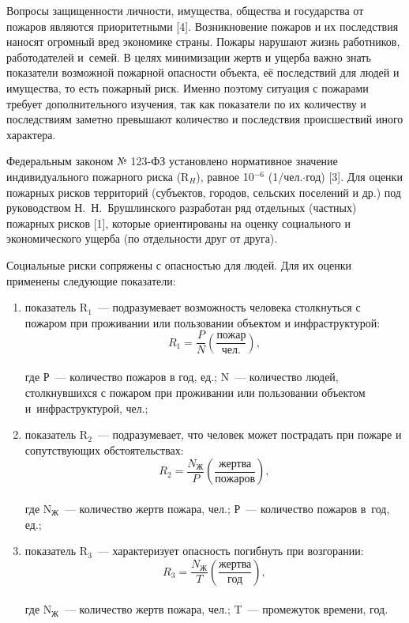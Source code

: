 



\makeProcTitleII
{}

Вопросы защищенности личности, имущества, общества и государства от пожаров являются приоритетными [4]. Возникновение пожаров и их последствия наносят огромный вред экономике страны. Пожары нарушают жизнь работников, работодателей и семей. В целях минимизации жертв и ущерба важно знать показатели возможной пожарной опасности объекта, её последствий для людей и имущества, то есть пожарный риск. Именно поэтому ситуация с пожарами требует дополнительного изучения, так как показатели по их количеству и последствиям заметно превышают количество и последствия происшествий иного характера.

Федеральным законом № 123-ФЗ установлено нормативное значение индивидуального пожарного риска (R$_H$), равное 10$^{-6}$ (1/чел.$\cdot$год) [3]. Для оценки пожарных рисков территорий (субъектов, городов, сельских поселений и др.) под руководством Н.~Н.~Брушлинского разработан ряд отдельных (частных) пожарных рисков [1], которые ориентированы на оценку социального и экономического ущерба (по отдельности друг от друга).

Социальные риски сопряжены с опасностью для людей. Для их оценки применены следующие показатели:
\begin{enumerate}[noitemsep]\vspace{-8pt}
  \item показатель R$_1$~--- подразумевает возможность человека столкнуться с пожаром при проживании или пользовании объектом и инфраструктурой:\\
  $$R_{1}=\frac{P}{N}\left(\dfrac{\text{пожар}}{\text{чел.}}\right),$$\\
  где Р~--- количество пожаров в год, ед.; N~--- количество людей, столкнувшихся с пожаром при проживании или пользовании объектом и~инфраструктурой, чел.;
  \item показатель R$_2$~--- подразумевает, что человек может пострадать при пожаре и сопутствующих обстоятельствах:\\
  $$R_{2}=\frac{N_\text{Ж}}{P}\left(\dfrac{\text{жертва}}{\text{пожаров}}\right),$$\\
  где N$_\text{Ж}$~--- количество жертв пожара, чел.; Р~--- количество пожаров в~год, ед.;
  \clearpage
  \item показатель R$_3$~--- характеризует опасность погибнуть при возгорании:\\
    $$R_{3}=\frac{N_\text{Ж}}{T}\left(\dfrac{\text{жертва}}{\text{год}}\right),$$\\
    где N$_\text{Ж}$~--- количество жертв пожара, чел.; T~--- промежуток времени, год.
\end{enumerate}
 \vspace{-8pt}

